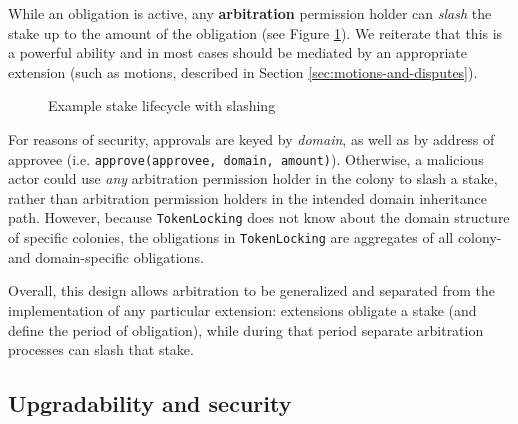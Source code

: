 While an obligation is active, any \textbf{arbitration} permission holder can \textit{slash} the stake up to the amount of the obligation (see Figure \ref{fig:stake-slash}). We reiterate that this is a powerful ability and in most cases should be mediated by an appropriate extension (such as motions, described in Section \ref{sec:motions-and-disputes}).

\begin{figure}[h]
    \centering
{}
 \caption{Example stake lifecycle with slashing}
 \label{fig:stake-slash}
\end{figure}

For reasons of security, approvals are keyed by \textit{domain}, as well as by address of approvee (i.e. \texttt{approve(approvee, domain, amount)}). Otherwise, a malicious actor could use \textit{any} arbitration permission holder in the colony to slash a stake, rather than arbitration permission holders in the intended domain inheritance path. However, because \texttt{TokenLocking} does not know about the domain structure of specific colonies, the obligations in \texttt{TokenLocking} are aggregates of all colony- and domain-specific obligations.

Overall, this design allows arbitration to be generalized and separated from the implementation of any particular extension: extensions obligate a stake (and define the period of obligation), while during that period separate arbitration processes can slash that stake.

\subsection{Upgradability and security}\label{subsec:upgradability}\label{sec:escape-hatches}

